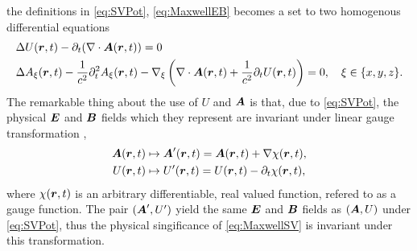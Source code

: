 the definitions in \cref{eq:SVPot}, \cref{eq:MaxwellEB} becomes a set to two homogenous 
differential equations
\begin{subequations}
\label{eq:MaxwellSV}
\begin{align}
&\Delta U(\boldsymbol{r},t ) - \partial_t (\nabla \cdot \boldsymbol{A}(\boldsymbol{r},t )) = 0\\
& \Delta A_\xi(\boldsymbol{r}, t) - \frac{1}{c^2} \partial^2_t A_\xi(\boldsymbol{r},t) - \nabla_\xi \left( \nabla \cdot \boldsymbol{A}(\boldsymbol{r},t) + \frac{1}{c^2}\partial_t U(\boldsymbol{r},t)\right)
 = 0, \quad \xi \in \{x,y,z\}.
\end{align}
\end{subequations}
The remarkable thing about the use of $U$ and $\boldsymbol{A}$ is that, due to \cref{eq:SVPot}, the  physical $\boldsymbol{E}$ and $\boldsymbol{B}$ fields
which they represent are invariant under linear gauge transformation ,
\begin{subequations}
\label{eq:GaugeFix}
\begin{align}
  \boldsymbol{A}(\boldsymbol{r}, t) &\mapsto \boldsymbol{A}'(\boldsymbol{r}, t) = \boldsymbol{A}(\boldsymbol{r},t) + \nabla \chi(\boldsymbol{r}, t), \\ 
  U(\boldsymbol{r},t) &\mapsto U'(\boldsymbol{r}, t) = U(\boldsymbol{r}, t) - \partial_t \chi(\boldsymbol{r}, t),
\end{align}
\end{subequations}
where $\chi(\boldsymbol{r},t)$ is an arbitrary differentiable, real valued function, refered to as a gauge function.
The pair $(\boldsymbol{A}', U')$ yield the same $\boldsymbol{E}$ and $\boldsymbol{B}$ fields as $(\boldsymbol{A}, U)$ under \cref{eq:SVPot},
thus the physical singificance of \cref{eq:MaxwellSV} is invariant under this transformation.

